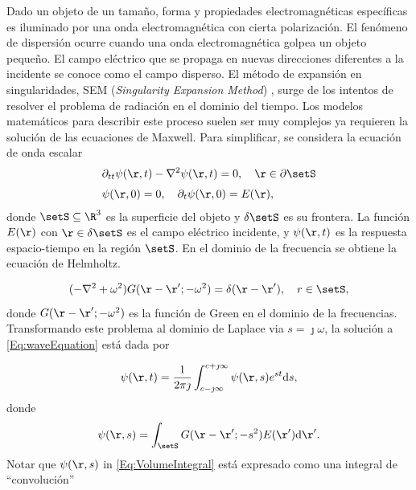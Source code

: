 Dado un objeto de un tamaño, forma y propiedades electromagnéticas específicas es iluminado por una onda electromagnética con cierta polarización. El fenómeno de dispersión  ocurre cuando una onda electromagnética golpea un objeto pequeño. El campo eléctrico que se propaga en nuevas direcciones diferentes a la incidente se conoce como el campo disperso. El método de expansión en singularidades, SEM (\emph{Singularity Expansion Method}) \cite{Baum1971}, surge de los intentos de resolver el problema de radiación en el dominio del tiempo. Los modelos matemáticos para describir este proceso suelen ser muy complejos ya requieren la solución de las ecuaciones de Maxwell. Para simplificar, se considera la ecuación de onda escalar
\begin{equation}
	\begin{aligned} 
		& \partial_{tt}\psi(\r,t) - \nabla^2\psi(\r,t) = 0, \quad \r\in\partial \setS\\[0.3em]
		& \psi(\r,0) = 0,\quad \partial_t\psi(\r,0) = E(\r),\\
	\end{aligned}
	\label{Eq:waveEquation}
\end{equation}
donde $\setS\subseteq\R^3$ es la superficie del objeto y $\delta \setS$ es su frontera. La función $E(\r)$ con $\r\in\delta \setS$ es el campo eléctrico incidente, y $\psi(\r,t)$ es la respuesta espacio-tiempo en la región $\setS$. En el dominio de la frecuencia se obtiene la ecuación de Helmholtz.	

\begin{equation}
	(-\nabla^2 + \omega^2)G(\r-\r';-\omega^2) = \delta(\r-\r'), \quad r\in \setS,
	\label{Eq:HelmholtzEquation}
\end{equation}
donde $G(\r-\r';-\omega^2)$ es la función de Green en el dominio de la frecuencias. Transformando este problema al dominio de Laplace via $s=\jmath\omega$, la solución a \eqref{Eq:waveEquation} está dada por

\begin{equation}
	\psi(\r,t) = \frac{1}{2\pi\jmath}\int_{c-\jmath\infty}^{c+\jmath\infty}\psi(\r,s)e^{st}\mathrm{d}s,
	\label{Eq:LaplaceDomain}
\end{equation}
donde 
\begin{equation}
	\psi(\r,s) = \int_{\setS} G(\r-\r';-s^2)E(\r')\mathrm{d}\r'.
	\label{Eq:VolumeIntegral}
\end{equation}
Notar que $\psi(\r,s)$ in \eqref{Eq:VolumeIntegral} está expresado como una integral de ``convolución'' %


